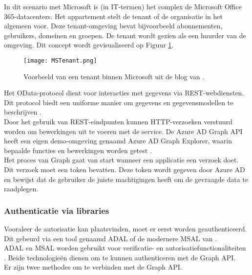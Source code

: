 In dit scenario met Microsoft is (in \ac{IT}-termen) het complex de Microsoft Office 365-datacenters. Het appartement stelt de tenant of de organisatie in het algemeen voor. Deze tenant-omgeving bevat bijvoorbeeld abonnementen, gebruikers, domeinen en groepen. De tenant wordt gezien als een huurder van de omgeving. Dit concept wordt gevisualiseerd op Figuur \ref{mst}. \\

\begin{figure}[!h]
    \texttt{[image: MSTenant.png]}
    \caption[Voorbeeld Microsoft tenant]{Voorbeeld van een tenant binnen Microsoft uit de blog van \textcite{Saxton2015}.}
    \label{mst}
\end{figure}

Het OData-protocol dient voor interacties met gegevens via \ac{REST}-webdiensten. Dit protocol biedt een uniforme manier om gegevens en gegevensmodellen te beschrijven \autocite{OData2023}. \\

Door het gebruik van \ac{REST}-eindpunten kunnen \ac{HTTP}-verzoeken verstuurd worden om bewerkingen uit te voeren met de service. De Azure \ac{AD} Graph \ac{API} heeft een eigen demo-omgeving genaamd Azure \ac{AD} Graph Explorer, waarin bepaalde functies en bewerkingen worden getest \autocite{Microsoft}. \\

Het proces van Graph gaat van start wanneer een applicatie een verzoek doet. Dit verzoek moet een token bevatten. Deze token wordt gegeven door Azure \ac{AD} en bewijst dat de gebruiker de juiste machtigingen heeft om de gevraagde data te raadplegen.



\subsubsection{Authenticatie via libraries}

Vooraleer de autorisatie kan plaatsvinden, moet er eerst worden geauthenticeerd. Dit gebeurd via een tool genaamd \ac{ADAL} of de modernere \ac{MSAL} van \textcite{Microsoft2022d}. \\

\ac{ADAL} en \ac{MSAL} worden gebruikt voor verificatie- en autorisatiefunctionaliteiten \autocite{Ooms2022}. Beide technologieën dienen om te kunnen authenticeren met de Graph \ac{API}. \\ 

Er zijn twee methodes om te verbinden met de Graph \ac{API}. \\

